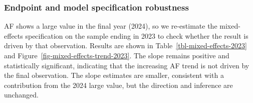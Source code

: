 \documentclass[
  12pt,
  letterpaper,
  DIV=11,
  numbers=noendperiod]{scrartcl}
\begin{document}
\subsubsection*{Endpoint and model specification
robustness}\label{endpoint-and-model-specification-robustness}

AF shows a large value in the final year (2024), so we re-estimate the
mixed-effects specification on the sample ending in 2023 to check
whether the result is driven by that observation. Results are shown in
Table~\ref{tbl-mixed-effects-2023} and
Figure~\ref{fig-mixed-effects-trend-2023}. The slope remains positive
and statistically significant, indicating that the increasing AF trend
is not driven by the final observation. The slope estimates are smaller,
consistent with a contribution from the 2024 large value, but the
direction and inference are unchanged.
\end{document}
